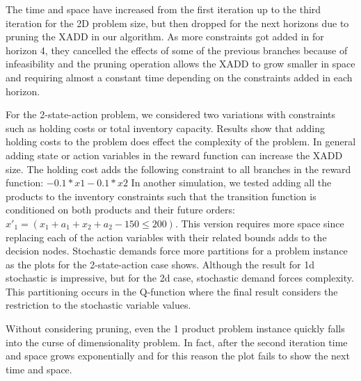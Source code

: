 The time and space have increased from the first iteration up to the third
iteration for the 2D problem size, but then dropped for the next horizons
due to pruning the XADD in our algorithm. As more constraints got added in
for horizon 4, they cancelled the effects of some of the previous branches
because of infeasibility and the pruning operation allows the XADD to grow
smaller in space and requiring almost a constant time depending on the
constraints added in each horizon.

For the 2-state-action problem, we considered two variations with constraints such as holding costs or total inventory capacity. Results show that adding holding costs to the problem does effect the complexity of the problem. In general adding state or action variables in the reward function can increase the XADD size. The holding cost adds the following constraint to all branches in the reward function: 
$ -0.1*x1 -0.1*x2 $
In another simulation, we tested adding all the products to the inventory constraints such that the transition function is conditioned on both products and their future orders:  $x'_1 = (x_1 + a_1 + x_2 +a_2 - 150 \leq 200) $. This version requires more space since replacing each of the action variables with their related bounds adds to the decision nodes.
Stochastic demands force more partitions for a problem instance as the plots for the 2-state-action case shows. Although the result for 1d stochastic is impressive, but for the 2d case, stochastic demand forces complexity. This partitioning occurs in the Q-function where the final result considers the restriction to the stochastic variable values. 

Without considering pruning, even the 1 product problem instance quickly falls into the curse of dimensionality problem. In fact, after the second iteration time and space grows exponentially and for this reason the plot fails to show the next time and
space.



